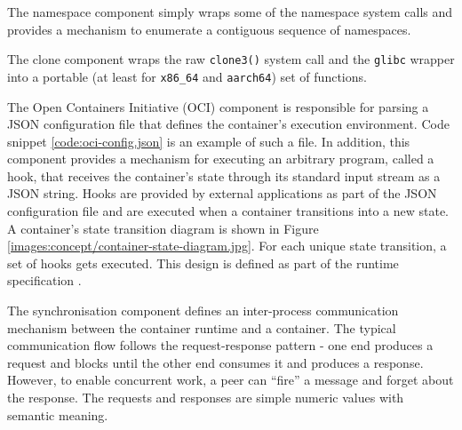 The namespace component simply wraps some of the namespace system calls and provides a 
mechanism to enumerate a contiguous sequence of namespaces.

The clone component wraps the raw \verb|clone3()| system call and the \verb|glibc| wrapper 
into a portable (at least for \verb|x86_64| and \verb|aarch64|) set of functions.

The Open Containers Initiative (OCI) component is responsible for parsing a JSON configuration 
file that defines the container's execution environment. Code snippet \ref{code:oci-config.json} 
is an example of such a file. In addition, this component provides a mechanism for executing an 
arbitrary program, called a hook, that receives the container's state through its standard input stream as a JSON string.
Hooks are provided by external applications as part of the JSON configuration file and are executed
when a container transitions into a new state. A container's state transition diagram is shown in 
Figure \ref{images:concept/container-state-diagram.jpg}. For each unique state transition, a set of hooks 
gets executed. This design is defined as part of the runtime specification \cite{oci-runtime-lifecycle}.   

The synchronisation component defines an inter-process communication mechanism between 
the container runtime and a container. The typical communication flow follows the request-response pattern - 
one end produces a request and blocks until the other end consumes it and produces a response.
However, to enable concurrent work, a peer can \enquote{fire} a message and forget about the response.
The requests and responses are simple numeric values with semantic meaning. 



